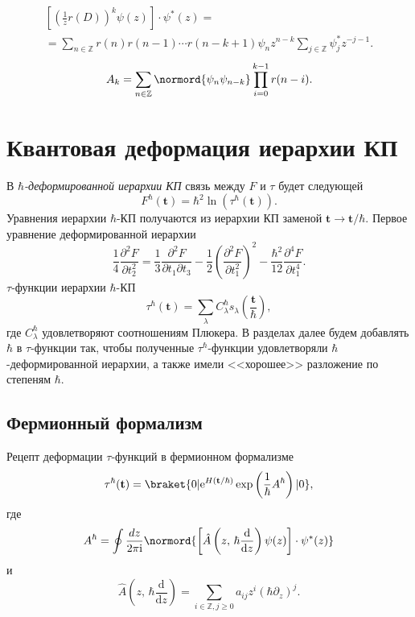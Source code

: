 \documentclass[a5paper,twoside]{article}
\numberwithin{equation}{section}
\begin{document}
\begin{multline}
	\left[ \left( \frac{1}{z}r(D)  \right) ^k
	\psi(z)\right] \cdot \psi^*(z)=\\=
	\sum_{n \in \mathbb{Z}}^{} r(n)r(n-1)\cdots
	r\left( n-k+1 \right) \psi_n z^{n-k}\sum_{j \in \mathbb{Z}}^{} \psi_j^* z^{-j-1}
.\end{multline}
\begin{equation}
	A_k=\sum_{n\in \mathbb{Z}}^{} \normord{\psi_n \psi_{n-k}}	\prod_{i=0}^{k-1} 
	r(n-i)\label{}
.\end{equation}
\section{Квантовая деформация иерархии КП}


В $\hbar $\emph{-деформированной иерархии КП} связь между $F$ и $\tau$ будет следующей
\begin{equation}
	F^\hbar \left( \mathbf{t} \right) =
	\hbar ^2 \ln \left( \tau^\hbar \left( \mathbf{t} \right)  \right) 
.\end{equation} 
Уравнения иерархии $\hbar$-КП получаются  из
иерархии КП заменой  $\mathbf{t}\to \mathbf{t} /\hbar $.
Первое уравнение деформированной иерархии
\begin{equation}
	\frac{1}{4} \frac{\partial ^2 F}{\partial t_2^2} =\frac{1}{3} \frac{\partial ^2 F}{\partial t_1 \partial t_3} -\frac{1}{2} \left( \frac{\partial^2 F}{\partial t_1^2} \right) ^2-\frac{\hbar ^2}{12} \frac{\partial^4 F}{
	\partial t_1^4}
.\end{equation} 
$\tau$-функции  иерархии $\hbar $-КП
\begin{equation}
	\tau^\hbar \left( \mathbf{t} \right) =
	\sum_{\lambda}^{} C_\lambda^\hbar 
	s_\lambda \left( \frac{\mathbf{t}}{\hbar } \right) 
	\label{eq:3}
,\end{equation} 
где $C^\hbar _{\lambda}$ удовлетворяют соотношениям Плюкера.
В разделах далее будем добавлять $\hbar $
в $\tau$-функции так, чтобы полученные $\tau^\hbar $-функции
удовлетворяли $\hbar$-деформированной иерархии, а также
имели  <<хорошее>> разложение по степеням $\hbar $.
\subsection{Фермионный формализм}
Рецепт деформации $\tau$-функций в фермионном формализме
\begin{equation}
	\tau^\hbar (\mathbf{t})= \braket{0 | \mathrm{e} ^{H\left( \mathbf{t} /\hbar  \right) } \exp \left( \frac{1}{\hbar }A^\hbar  \right) | 0}
,\end{equation} 
где
\begin{equation}
A^\hbar = \oint \frac{dz}{2\pi \mathrm{i} }
\normord{\left[ \hat{A}\left( z,\,\hbar \frac{\mathrm{d} }{\mathrm{d} z}\right)\psi(z)   \right] \cdot \psi^*(z)}
\end{equation} 
и
\begin{equation}
	\hat{A}\left( z,\,\hbar  \frac{\mathrm{d} }{\mathrm{d} z} \right) = \sum_{i \in \mathbb{Z},j\ge 0}^{} a_{ij}
	z^i \left( \hbar  \partial_z \right) ^j
.\end{equation} 
\end{document}
